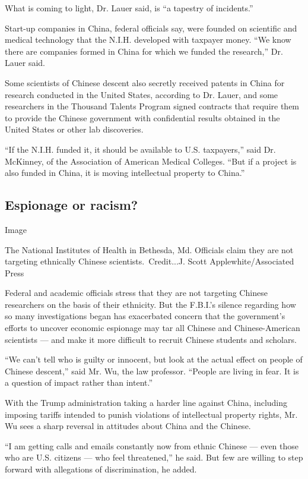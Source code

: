 What is coming to light, Dr. Lauer said, is ``a tapestry of incidents.''

Start-up companies in China, federal officials say, were founded on
scientific and medical technology that the N.I.H. developed with
taxpayer money. ``We know there are companies formed in China for which
we funded the research,'' Dr. Lauer said.

Some scientists of Chinese descent also secretly received patents in
China for research conducted in the United States, according to Dr.
Lauer, and some researchers in the Thousand Talents Program signed
contracts that require them to provide the Chinese government with
confidential results obtained in the United States or other lab
discoveries.

``If the N.I.H. funded it, it should be available to U.S. taxpayers,''
said Dr. McKinney, of the Association of American Medical Colleges.
``But if a project is also funded in China, it is moving intellectual
property to China.''

\hypertarget{espionage-or-racism}{%
\subsection{Espionage or racism?}\label{espionage-or-racism}}

Image

The National Institutes of Health in Bethesda, Md. Officials claim they
are not targeting ethnically Chinese scientists.~Credit...J. Scott
Applewhite/Associated Press

Federal and academic officials stress that they are not targeting
Chinese researchers on the basis of their ethnicity. But the F.B.I.'s
silence regarding how so many investigations began has exacerbated
concern that the government's efforts to uncover economic espionage may
tar all Chinese and Chinese-American scientists --- and make it more
difficult to recruit Chinese students and scholars.

``We can't tell who is guilty or innocent, but look at the actual effect
on people of Chinese descent,'' said Mr. Wu, the law professor. ``People
are living in fear. It is a question of impact rather than intent.''

With the Trump administration taking a harder line against China,
including imposing tariffs intended to punish violations of intellectual
property rights, Mr. Wu sees a sharp reversal in attitudes about China
and the Chinese.

``I am getting calls and emails constantly now from ethnic Chinese ---
even those who are U.S. citizens --- who feel threatened,'' he said. But
few are willing to step forward with allegations of discrimination, he
added.

